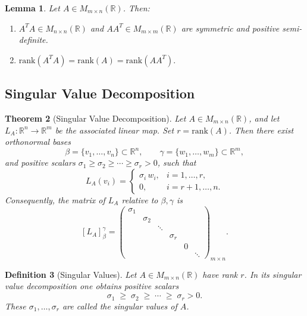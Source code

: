 \documentclass[12pt]{article}
\theoremstyle{break}             %
\newtheorem{thm}{Theorem}          %
\newtheorem{lem}[thm]{Lemma}
\newtheorem{defn}[thm]{Definition}
\begin{document}
\begin{lem}
Let \(A\in M_{m\times n}(\mathbb{R})\).  Then:
\begin{enumerate}
  \item \(A^T A\in M_{n\times n}(\mathbb{R})\) and \(A A^T\in M_{m\times m}(\mathbb{R})\) are symmetric and positive semi-definite.
  \item \(\displaystyle \mathrm{rank}(A^T A) = \mathrm{rank}(A) = \mathrm{rank}(A A^T).\)
\end{enumerate}
\end{lem}

\subsection{Singular Value Decomposition}

\begin{thm}[Singular Value Decomposition]
Let \(A\in M_{m\times n}(\mathbb{R})\), and let \(L_A:\mathbb{R}^n\to\mathbb{R}^m\) be the associated linear map.  Set \(r=\mathrm{rank}(A)\).  Then there exist orthonormal bases
\[
\beta = \{v_1,\dots,v_n\}\subset\mathbb{R}^n,
\qquad
\gamma=\{w_1,\dots,w_m\}\subset\mathbb{R}^m,
\]
and positive scalars
\(\sigma_1\ge\sigma_2\ge\cdots\ge\sigma_r>0\),
such that
\[
L_A(v_i) =
\begin{cases}
\sigma_i\,w_i, & i=1,\dots,r,\\
0, & i=r+1,\dots,n.
\end{cases}
\]
Consequently, the matrix of \(L_A\) relative to \(\beta,\gamma\) is
\[
[L_A]_\beta^\gamma
=
\begin{pmatrix}
\sigma_1 &        &        &        &        &        \\
         & \sigma_2 &        &        &        &        \\
         &        & \ddots &        &        &        \\
         &        &        & \sigma_r &        &        \\
         &        &        &        & 0      &        \\
         &        &        &        &        & \ddots 
\end{pmatrix}_{m\times n}.
\]
\end{thm}

\begin{defn}[Singular Values]
Let \(A\in M_{m\times n}(\mathbb{R})\) have rank \(r\).  In its singular value decomposition one obtains positive scalars
\[
\sigma_1 \;\ge\;\sigma_2\;\ge\;\cdots\;\ge\;\sigma_r>0.
\]
These \(\sigma_1,\dots,\sigma_r\) are called the \emph{singular values} of \(A\).
\end{defn}
\end{document}
